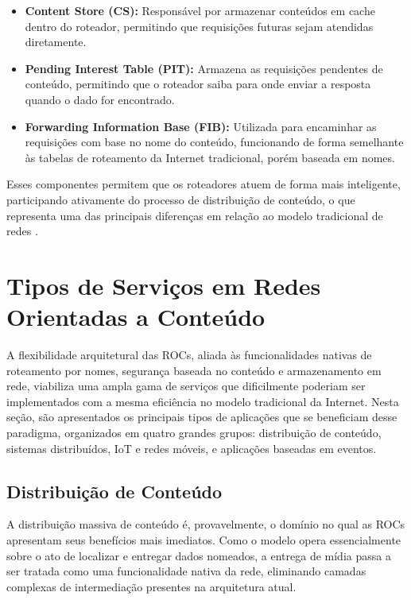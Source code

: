 \documentclass[12pt]{article}
\begin{document}
\begin{itemize}

\item \textbf{Content Store (CS):}
Responsável por armazenar conteúdos em cache dentro do roteador, permitindo que requisições futuras sejam atendidas diretamente.

\item \textbf{Pending Interest Table (PIT):}
Armazena as requisições pendentes de conteúdo, permitindo que o roteador saiba para onde enviar a resposta quando o dado for encontrado.

\item \textbf{Forwarding Information Base (FIB):}
Utilizada para encaminhar as requisições com base no nome do conteúdo, funcionando de forma semelhante às tabelas de roteamento da Internet tradicional, porém baseada em nomes.

\end{itemize}

Esses componentes permitem que os roteadores atuem de forma mais inteligente, participando ativamente do processo de distribuição de conteúdo, o que representa uma das principais diferenças em relação ao modelo tradicional de redes \cite{ambiel2013redes}.

\section{Tipos de Serviços em Redes Orientadas a Conteúdo}

A flexibilidade arquitetural das ROCs, aliada às funcionalidades nativas de roteamento por nomes, segurança baseada no conteúdo e armazenamento em rede, viabiliza uma ampla gama de serviços que dificilmente poderiam ser implementados com a mesma eficiência no modelo tradicional da Internet. Nesta seção, são apresentados os principais tipos de aplicações que se beneficiam desse paradigma, organizados em quatro grandes grupos: distribuição de conteúdo, sistemas distribuídos, IoT e redes móveis, e aplicações baseadas em eventos.

\subsection{Distribuição de Conteúdo}

A distribuição massiva de conteúdo é, provavelmente, o domínio no qual as ROCs apresentam seus benefícios mais imediatos. Como o modelo opera essencialmente sobre o ato de localizar e entregar dados nomeados, a entrega de mídia passa a ser tratada como uma funcionalidade nativa da rede, eliminando camadas complexas de intermediação presentes na arquitetura atual.
\end{document}
